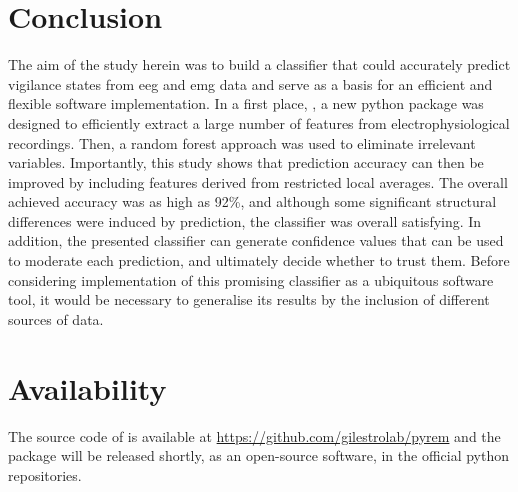 \section*{Conclusion}

The aim of the study herein was to build a classifier that could accurately predict vigilance states from \gls{eeg} and \gls{emg} data
and serve as a basis for an efficient and flexible software implementation.
In a first place, \pr{}, a new python package was designed to efficiently extract a large number of features from electrophysiological recordings.
Then, a random forest approach was used to eliminate irrelevant variables.
Importantly, this study shows that prediction accuracy can then be improved by including features derived from restricted local averages.
The overall achieved accuracy was as high as 92\%, and although some significant structural differences were induced by prediction,
the classifier was overall satisfying.
In addition, the presented classifier can generate confidence values that can be used to moderate each prediction, and ultimately decide whether to trust them.
Before considering implementation of this promising classifier as a ubiquitous software tool,
it would be necessary to generalise its results by the inclusion of different sources of data.

\section*{Availability}
The source code of \pr{} is available at \href{https://github.com/gilestrolab/pyrem}{https://github.com/gilestrolab/pyrem}
and the package will be released shortly, as an open-source software, in the official python repositories.



